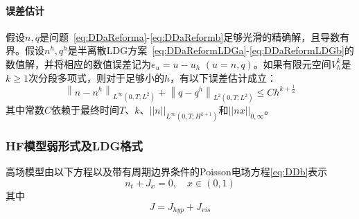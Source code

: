 \paragraph{误差估计}
假设$n, q$是问题~\eqref{eq:DDaReforma}-\eqref{eq:DDaReformb}足够光滑的精确解，且导数有界。假设$n^{h}, q^{h}$是半离散LDG方案~\eqref{eq:DDaReformLDGa}-\eqref{eq:DDaReformLDGb}的数值解，并将相应的数值误差记为$e_{u}=u-u_{h}$ $(u=n, q)$。如果有限元空间$V_{h}^{k}$是$k \geq 1$次分段多项式，则对于足够小的$h$，有以下误差估计成立：
$$
    \left\|n-n^{h}\right\|_{L^{\infty}\left(0, T ; L^{2}\right)}+\left\|q-q^{h}\right\|_{L^{2}\left(0, T ; L^{2}\right)} \leq C h^{k+\frac{1}{2}}
$$
其中常数$C$依赖于最终时间$T$、$k$、$||n||_{L^{\infty}\left(0, T ; H^{k+1}\right)}$和$\left||n{x}\right||_{0, \infty}$。
\subsubsection{HF模型弱形式及LDG格式}
高场模型由以下方程以及带有周期边界条件的Poisson电场方程\eqref{eq:DDb}表示
\begin{equation}
    n_{t}+J_{x}=0, \quad x \in(0,1) \label{eq:HF}
\end{equation}
其中
$$
    J=J_{h y p}+J_{v i s}
$$


